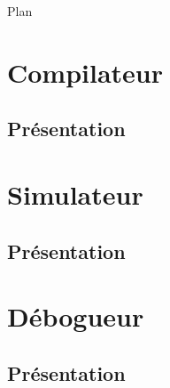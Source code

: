 \documentclass{beamer}
\author[Claude Stolze, Pierre Donat-Bouillud, Maël Lansade]{Claude Stolze , Pierre Donat-Bouillud \and Maël Lansade}
\institute[ENS Cachan - Antenne de Bretagne]
\begin{document}
\begin{frame}
  \titlepage
\end{frame}

\begin{frame}{Plan}
  \tableofcontents
\end{frame}

\section{Compilateur}
\subsection{Présentation}

\section{Simulateur}
\subsection{Présentation}

\section{Débogueur}
\subsection{Présentation}
\end{document}
